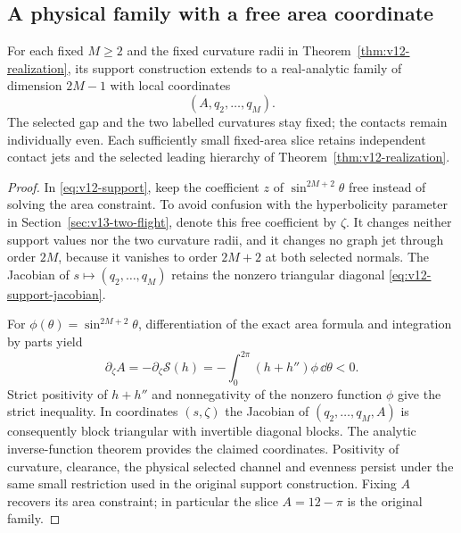 \subsection{A physical family with a free area coordinate}
\begin{proposition}
\label{prop:v14-free-area}
For each fixed $M\ge2$ and the fixed curvature radii in
Theorem~\ref{thm:v12-realization}, its support construction extends to
a real-analytic family of dimension $2M-1$ with local coordinates
\[
                (A,q_2,\ldots,q_M).
\]
The selected gap and the two labelled curvatures stay fixed; the
contacts remain individually even. Each sufficiently small fixed-area
slice retains independent contact jets and the selected leading
hierarchy of Theorem~\ref{thm:v12-realization}.
\end{proposition}
\begin{proof}
In \eqref{eq:v12-support}, keep the coefficient $z$ of
$\sin^{2M+2}\theta$ free instead of solving the area constraint.
To avoid confusion with the hyperbolicity parameter in
Section~\ref{sec:v13-two-flight}, denote this free coefficient by $\zeta$.
It changes neither support values nor the two curvature radii, and
it changes no graph jet through order $2M$, because it vanishes to
order $2M+2$ at both selected normals. The Jacobian of
$s\mapsto(q_2,\ldots,q_M)$ retains the nonzero triangular diagonal
\eqref{eq:v12-support-jacobian}.

For $\phi(\theta)=\sin^{2M+2}\theta$, differentiation of the exact
area formula and integration by parts yield
\[
 \partial_\zeta A
  =-\partial_\zeta\mathcal S(h)
  =-\int_0^{2\pi}(h+h'')\phi\,\dd\theta<0.
\]
Strict positivity of $h+h''$ and nonnegativity of the nonzero function
$\phi$ give the strict inequality. In coordinates $(s,\zeta)$ the
Jacobian of $(q_2,\ldots,q_M,A)$ is consequently block triangular
with invertible diagonal blocks. The analytic inverse-function theorem
provides the claimed coordinates. Positivity of curvature, clearance,
the physical selected channel and evenness persist under the same
small restriction used in the original support construction. Fixing
$A$ recovers its area constraint; in particular the slice
$A=12-\pi$ is the original family.
\end{proof}

